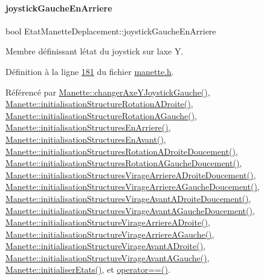 \paragraph{\texorpdfstring{joystick\+Gauche\+En\+Arriere}{joystickGaucheEnArriere}}
{\footnotesize\ttfamily bool Etat\+Manette\+Deplacement\+::joystick\+Gauche\+En\+Arriere}



Membre définissant l\textquotesingle{}état du joystick sur l\textquotesingle{}axe Y. 



Définition à la ligne \hyperlink{manette_8h_source_l00181}{181} du fichier \hyperlink{manette_8h_source}{manette.\+h}.



Référencé par \hyperlink{manette_8cpp_source_l00438}{Manette\+::changer\+Axe\+Y\+Joystick\+Gauche()}, \hyperlink{manette_8cpp_source_l00178}{Manette\+::initialisation\+Structure\+Rotation\+A\+Droite()}, \hyperlink{manette_8cpp_source_l00151}{Manette\+::initialisation\+Structure\+Rotation\+A\+Gauche()}, \hyperlink{manette_8cpp_source_l00127}{Manette\+::initialisation\+Structures\+En\+Arriere()}, \hyperlink{manette_8cpp_source_l00103}{Manette\+::initialisation\+Structures\+En\+Avant()}, \hyperlink{manette_8cpp_source_l00188}{Manette\+::initialisation\+Structures\+Rotation\+A\+Droite\+Doucement()}, \hyperlink{manette_8cpp_source_l00161}{Manette\+::initialisation\+Structures\+Rotation\+A\+Gauche\+Doucement()}, \hyperlink{manette_8cpp_source_l00296}{Manette\+::initialisation\+Structures\+Virage\+Arriere\+A\+Droite\+Doucement()}, \hyperlink{manette_8cpp_source_l00269}{Manette\+::initialisation\+Structures\+Virage\+Arriere\+A\+Gauche\+Doucement()}, \hyperlink{manette_8cpp_source_l00242}{Manette\+::initialisation\+Structures\+Virage\+Avant\+A\+Droite\+Doucement()}, \hyperlink{manette_8cpp_source_l00215}{Manette\+::initialisation\+Structures\+Virage\+Avant\+A\+Gauche\+Doucement()}, \hyperlink{manette_8cpp_source_l00286}{Manette\+::initialisation\+Structure\+Virage\+Arriere\+A\+Droite()}, \hyperlink{manette_8cpp_source_l00259}{Manette\+::initialisation\+Structure\+Virage\+Arriere\+A\+Gauche()}, \hyperlink{manette_8cpp_source_l00232}{Manette\+::initialisation\+Structure\+Virage\+Avant\+A\+Droite()}, \hyperlink{manette_8cpp_source_l00205}{Manette\+::initialisation\+Structure\+Virage\+Avant\+A\+Gauche()}, \hyperlink{manette_8cpp_source_l00023}{Manette\+::initialiser\+Etats()}, et \hyperlink{manette_8cpp_source_l00636}{operator==()}.

\mbox{\label{struct_etat_manette_deplacement_a8c8e3ca694408bc6a6ced4e20b9da0be}} 
